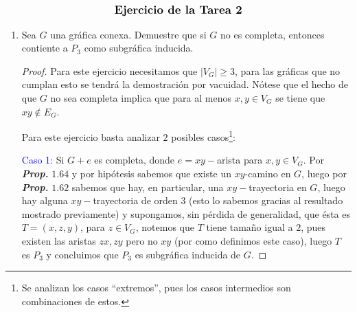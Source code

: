\documentclass{article}
\begin{document}
$$\text{\textbf{\large Ejercicio de la Tarea 2}}$$
\begin{enumerate}
  \item \text{[Ejercicio 3]}

    Sea $G$ una gr\'afica conexa. Demuestre que si $G$ no es completa, entonces contiente a $P_3$ como subgr\'afica inducida.

    \renewcommand\qedsymbol{QED}
    \begin{proof}

      Para este ejercicio necesitamos que $|V_G| \geq 3$, para las
      gr\'aficas que no cumplan esto se tendr\'a la demostraci\'on por vacuidad.
      Nótese que el hecho de que $G$ no sea completa implica que para al
      menos $x,y \in V_G$ se tiene que $xy \notin E_G$.

      \begin{center}
      \end{center}

      Para este ejercicio basta analizar $2$ posibles casos\footnote{Se
      analizan los casos ``extremos'', pues los casos intermedios son combinaciones
      de estos.}:

      \textcolor{blue}{Caso 1:} Si $G + e$ es completa, donde $e = xy-$arista para
      $x,y \in V_G$. Por \textbf{\textit{Prop.}} $\mathbf{1.64}$ y por hipótesis
      sabemos que existe un $xy$-camino en $G$, luego por \textbf{\textit{Prop.}}
      $\mathbf{1.62}$ sabemos que hay, en particular, una $xy-$trayectoria en $G$,
      luego hay alguna $xy-$trayectoria de orden $3$ (esto lo sabemos gracias al
      resultado mostrado previamente) y supongamos, sin p\'erdida de generalidad,
      que \'esta es $T = (x,z,y)$, para $z \in V_G$, notemos que $T$ tiene tamaño
      igual a $2$, pues existen las aristas $zx, zy$ pero no $xy$ (por como definimos
      este caso), luego $T$ es $P_3$ y concluimos que $P_3$ es subgr\'afica inducida
      de $G$.


\end{proof}
\end{enumerate}
\end{document}

